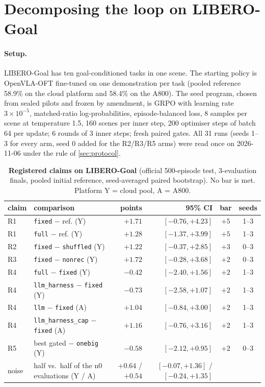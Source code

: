 \section{Decomposing the loop on LIBERO-Goal}
\label{sec:libero}

\paragraph{Setup.} LIBERO-Goal has ten goal-conditioned tasks in one scene. The starting policy is OpenVLA-OFT fine-tuned on one demonstration per task (pooled reference 58.9\% on the cloud platform and 58.4\% on the A800). The seed program, chosen from sealed pilots and frozen by amendment, is GRPO with learning rate $3\times10^{-5}$, matched-ratio log-probabilities, episode-balanced loss, 8 samples per scene at temperature 1.5, 160 scenes per inner step, 200 optimiser steps of batch 64 per update; 6 rounds of 3 inner steps; fresh paired gates. All 31 runs (seeds 1--3 for every arm, seed 0 added for the R2/R3/R5 arms) were read once on 2026-11-06 under the rule of \cref{sec:protocol}.

\begin{table}[t]
  \centering
  \small
  \caption{\textbf{Registered claims on LIBERO-Goal} (official 500-episode test, 3-evaluation finals, pooled initial reference, seed-averaged paired bootstrap). No bar is met. Platform Y = cloud pool, A = A800.}
  \label{tab:goal}
  \begin{tabular}{@{}llrrcc@{}}
    \toprule
    claim & comparison & points & 95\% CI & bar & seeds \\
    \midrule
    R1 & \texttt{fixed} $-$ ref. (Y) & $+1.71$ & $[-0.76, +4.23]$ & $+5$ & 1--3 \\
    R1 & \texttt{full} $-$ ref. (Y) & $+1.28$ & $[-1.37, +3.99]$ & $+5$ & 1--3 \\
    R2 & \texttt{fixed} $-$ \texttt{shuffled} (Y) & $+1.22$ & $[-0.37, +2.85]$ & $+3$ & 0--3 \\
    R3 & \texttt{fixed} $-$ \texttt{nonrec} (Y) & $+1.72$ & $[-0.28, +3.68]$ & $+2$ & 0--3 \\
    R4 & \texttt{full} $-$ \texttt{fixed} (Y) & $-0.42$ & $[-2.40, +1.56]$ & $+2$ & 1--3 \\
    R4 & \texttt{llm\_harness} $-$ \texttt{fixed} (Y) & $-0.73$ & $[-2.58, +1.07]$ & $+2$ & 1--3 \\
    R4 & \texttt{llm} $-$ \texttt{fixed} (A) & $+1.04$ & $[-0.84, +3.00]$ & $+2$ & 1--3 \\
    R4 & \texttt{llm\_harness\_cap} $-$ \texttt{fixed} (A) & $+1.16$ & $[-0.76, +3.16]$ & $+2$ & 1--3 \\
    R5 & best gated $-$ \texttt{onebig} (Y) & $-0.58$ & $[-2.12, +0.95]$ & $+2$ & 0--3 \\
    \midrule
    noise & half vs.\ half of the n0 evaluations (Y / A) & $+0.64$ / $+0.54$ & $[-0.07, +1.36]$ / $[-0.24, +1.35]$ & & \\
    \bottomrule
  \end{tabular}
\end{table}

